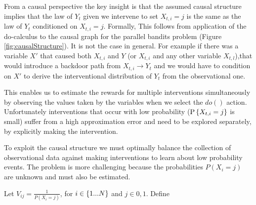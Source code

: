 From a causal perspective the key insight is that the assumed causal structure implies that
the law of $Y_t$ given we intervene to set $X_{t,i} = j$ is the same as the law of $Y_t$ conditioned
on $X_{t,i} = j$. Formally,
This follows from application of the do-calculus \cite{Pearl2000} to the causal graph for the parallel bandits problem (Figure \ref{fig:causalStructure}). It is not the case in general. 
For example if there was a variable $X'$ that caused both $X_{t,i}$ and $Y$ (or $X_{t,i}$ and any other variable $X_{t,l}$),that would introduce a backdoor path from $X_{t,i} \rightarrow Y_t$ and we would have to condition on $X'$ to derive the interventional distribution of $Y_t$ from the observational one.

This enables us to estimate the rewards for multiple interventions simultaneously by observing the values taken by the variables when we select the $do()$ action. Unfortunately interventions that occur with low probability ($\P{X_{t,i} = j}$ is small) suffer from a high approximation error and need to be explored separately, by explicitly making the intervention. 

To exploit the causal structure we must optimally balance the collection of observational data against making interventions to learn about low probability events. The problem is more challenging because the probabilities $P(X_i=j)$ are unknown and must also be estimated.

\begin{definition}
Let $V_{ij} = \frac{1}{P(X_i = j)}$, for $i \in \set{1...N}$ and $j \in {0,1}$. 
Define 
\end{definition}
